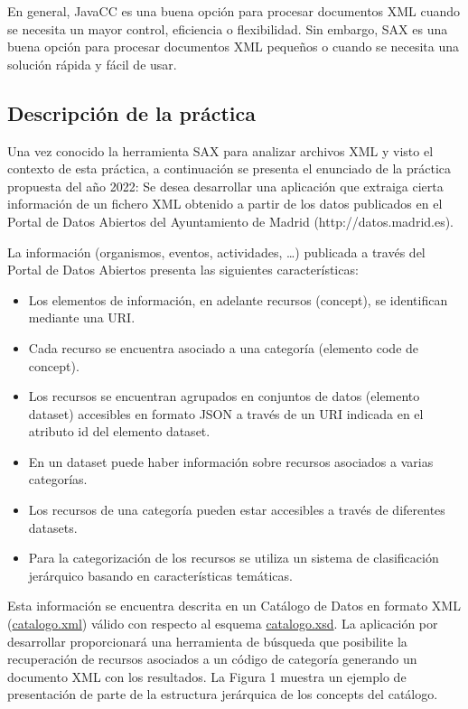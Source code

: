 En general, JavaCC es una buena opción para procesar documentos XML cuando se necesita un mayor control, eficiencia o flexibilidad. Sin embargo, SAX es una buena opción para procesar documentos XML pequeños o cuando se necesita una solución rápida y fácil de usar.

\subsection{Descripción de la práctica}

\noindent Una vez conocido la herramienta SAX para analizar archivos XML y visto el contexto de esta práctica, a continuación se presenta el enunciado de la práctica propuesta del año 2022:
Se desea desarrollar una aplicación que extraiga cierta información de un fichero XML obtenido a partir de los datos publicados en el Portal de Datos Abiertos del Ayuntamiento de Madrid (http://datos.madrid.es).

La información (organismos, eventos, actividades, …) publicada a través del Portal de Datos Abiertos presenta las siguientes características:

\begin{itemize}
    \item Los elementos de información, en adelante recursos (concept), se identifican mediante una URI.
    \item Cada recurso se encuentra asociado a una categoría (elemento code de concept).
    \item Los recursos se encuentran agrupados en conjuntos de datos (elemento dataset) accesibles en formato JSON a través de un URI indicada en el atributo id del elemento dataset.
    \item En un dataset puede haber información sobre recursos asociados a varias categorías.
    \item Los recursos de una categoría pueden estar accesibles a través de diferentes datasets.
    \item Para la categorización de los recursos se utiliza un sistema de clasificación jerárquico basando en características temáticas.
\end{itemize}

Esta información se encuentra descrita en un Catálogo de Datos en formato XML (\hyperref[sec:catalogoxml]{catalogo.xml}) válido con respecto al esquema \hyperref[sec:catalogoxsd]{catalogo.xsd}.
La aplicación por desarrollar proporcionará una herramienta de búsqueda que posibilite la recuperación de recursos asociados a un código de categoría generando un documento XML con los resultados.
La Figura 1 muestra un ejemplo de presentación de parte de la estructura jerárquica de los concepts del catálogo.

